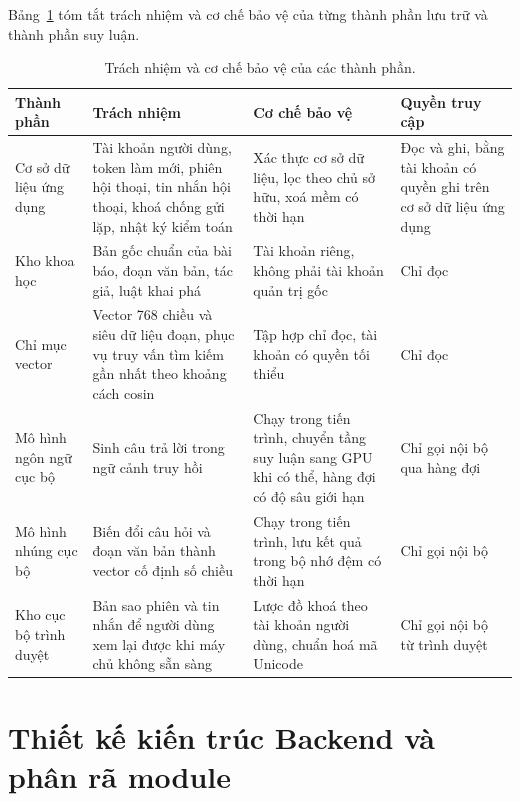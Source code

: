 Bảng~\ref{tab:trach-nhiem-thanh-phan} tóm tắt trách nhiệm và cơ chế bảo vệ của từng thành phần lưu trữ và thành phần suy luận.

\begin{table}[htbp]
    \centering
    \caption{Trách nhiệm và cơ chế bảo vệ của các thành phần.}
    \label{tab:trach-nhiem-thanh-phan}
    \small
    \begin{tabularx}{\textwidth}{@{}>{\raggedright\arraybackslash}p{2.7cm}>{\raggedright\arraybackslash}p{4.3cm}>{\raggedright\arraybackslash}p{4.1cm}>{\raggedright\arraybackslash}X@{}}
        \toprule
        \textbf{Thành phần} & \textbf{Trách nhiệm} & \textbf{Cơ chế bảo vệ} & \textbf{Quyền truy cập} \\
        \midrule
        Cơ sở dữ liệu ứng dụng & Tài khoản người dùng, token làm mới, phiên hội thoại, tin nhắn hội thoại, khoá chống gửi lặp, nhật ký kiểm toán & Xác thực cơ sở dữ liệu, lọc theo chủ sở hữu, xoá mềm có thời hạn & Đọc và ghi, bằng tài khoản có quyền ghi trên cơ sở dữ liệu ứng dụng \\
        Kho khoa học & Bản gốc chuẩn của bài báo, đoạn văn bản, tác giả, luật khai phá & Tài khoản riêng, không phải tài khoản quản trị gốc & Chỉ đọc \\
        Chỉ mục vector & Vector 768 chiều và siêu dữ liệu đoạn, phục vụ truy vấn tìm kiếm gần nhất theo khoảng cách cosin & Tập hợp chỉ đọc, tài khoản có quyền tối thiểu & Chỉ đọc \\
        Mô hình ngôn ngữ cục bộ & Sinh câu trả lời trong ngữ cảnh truy hồi & Chạy trong tiến trình, chuyển tầng suy luận sang GPU khi có thể, hàng đợi có độ sâu giới hạn & Chỉ gọi nội bộ qua hàng đợi \\
        Mô hình nhúng cục bộ & Biến đổi câu hỏi và đoạn văn bản thành vector cố định số chiều & Chạy trong tiến trình, lưu kết quả trong bộ nhớ đệm có thời hạn & Chỉ gọi nội bộ \\
        Kho cục bộ trình duyệt & Bản sao phiên và tin nhắn để người dùng xem lại được khi máy chủ không sẵn sàng & Lược đồ khoá theo tài khoản người dùng, chuẩn hoá mã Unicode & Chỉ gọi nội bộ từ trình duyệt \\
        \bottomrule
    \end{tabularx}
\end{table}

\section{Thiết kế kiến trúc Backend và phân rã module}
\label{sec:kien-truc-backend}


